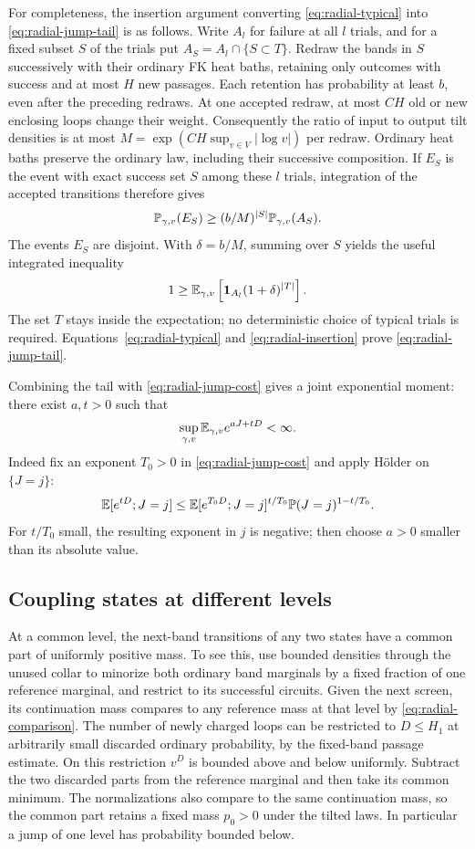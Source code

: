 For completeness, the insertion argument converting
\eqref{eq:radial-typical} into \eqref{eq:radial-jump-tail} is as
follows. Write $A_l$ for failure at all $l$ trials, and for a fixed
subset $S$ of the trials put $A_S=A_l\cap\{S\subset T\}$. Redraw
the bands in $S$ successively with their ordinary FK heat baths,
retaining only outcomes with success and at most $H$ new passages.
Each retention has probability at least $b$, even after the preceding
redraws. At one accepted redraw, at most $CH$ old or new enclosing
loops change their weight. Consequently the ratio of input to output
tilt densities is at most
$M=\exp(CH\sup_{v\in V}|\log v|)$ per redraw.
Ordinary heat baths preserve the ordinary law, including their
successive composition. If $E_S$ is the event with exact success
set $S$ among these $l$ trials, integration of the accepted transitions
therefore gives
\[
 \mathbb P_{\gamma,v}(E_S)
       \ge (b/M)^{|S|}\mathbb P_{\gamma,v}(A_S).
\]
The events $E_S$ are disjoint. With $\delta=b/M$, summing over $S$
yields the useful integrated inequality
\begin{equation}\label{eq:radial-insertion}
 1\ge
 \mathbb E_{\gamma,v}\left[\mathbf 1_{A_l}(1+\delta)^{|T|}\right].
\end{equation}
The set $T$ stays inside the expectation; no deterministic choice of
typical trials is required. Equations~\eqref{eq:radial-typical} and
\eqref{eq:radial-insertion} prove \eqref{eq:radial-jump-tail}.

Combining the tail with \eqref{eq:radial-jump-cost} gives a joint
exponential moment: there exist $a,t>0$ such that
\begin{equation}\label{eq:radial-joint-moment}
 \sup_{\gamma,v}\mathbb E_{\gamma,v}e^{aJ+tD}<\infty.
\end{equation}
Indeed fix an exponent $T_0>0$ in
\eqref{eq:radial-jump-cost} and apply H\"older on $\{J=j\}$:
\[
 \mathbb E[e^{tD};J=j]
 \le \mathbb E[e^{T_0D};J=j]^{t/T_0}
             \mathbb P(J=j)^{1-t/T_0}.
\]
For $t/T_0$ small, the resulting exponent in $j$ is negative; then
choose $a>0$ smaller than its absolute value.

\subsection{Coupling states at different levels}

At a common level, the next-band transitions of any two states have
a common part of uniformly positive mass. To see this, use bounded
densities through the unused collar to minorize both ordinary
band marginals by a fixed fraction of one reference marginal, and
restrict to its successful circuits. Given the next screen, its
continuation mass compares to any reference mass at that level by
\eqref{eq:radial-comparison}. The number of newly charged loops can
be restricted to $D\le H_1$ at arbitrarily small discarded ordinary
probability, by the fixed-band passage estimate. On this restriction
$v^D$ is bounded above and below uniformly. Subtract the two discarded
parts from the reference marginal and then take its common minimum.
The normalizations also compare to the same continuation mass, so
the common part retains a fixed mass $p_0>0$ under the tilted laws.
In particular a jump of one level has probability bounded below.

